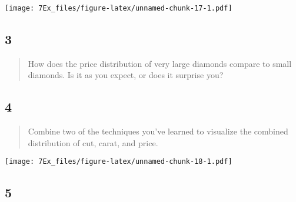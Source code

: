\documentclass[]{article}
\newenvironment{Shaded}{\begin{snugshade}}{\end{snugshade}}
\newcommand{\DataTypeTok}[1]{\textcolor[rgb]{0.13,0.29,0.53}{#1}}
\newcommand{\DecValTok}[1]{\textcolor[rgb]{0.00,0.00,0.81}{#1}}
\newcommand{\KeywordTok}[1]{\textcolor[rgb]{0.13,0.29,0.53}{\textbf{#1}}}
\newcommand{\NormalTok}[1]{#1}
\newcommand{\OperatorTok}[1]{\textcolor[rgb]{0.81,0.36,0.00}{\textbf{#1}}}
\newcommand{\StringTok}[1]{\textcolor[rgb]{0.31,0.60,0.02}{#1}}
\begin{document}
\begin{Shaded}
\end{Shaded}

\texttt{[image: 7Ex\_files/figure-latex/unnamed-chunk-17-1.pdf]}

\hypertarget{section-19}{%
\subsection{3}\label{section-19}}

\begin{quote}
How does the price distribution of very large diamonds compare to small
diamonds. Is it as you expect, or does it surprise you?
\end{quote}

\hypertarget{section-20}{%
\subsection{4}\label{section-20}}

\begin{quote}
Combine two of the techniques you've learned to visualize the combined
distribution of cut, carat, and price.
\end{quote}

\begin{Shaded}
\end{Shaded}

\texttt{[image: 7Ex\_files/figure-latex/unnamed-chunk-18-1.pdf]}

\hypertarget{section-21}{%
\subsection{5}\label{section-21}}
\end{document}
